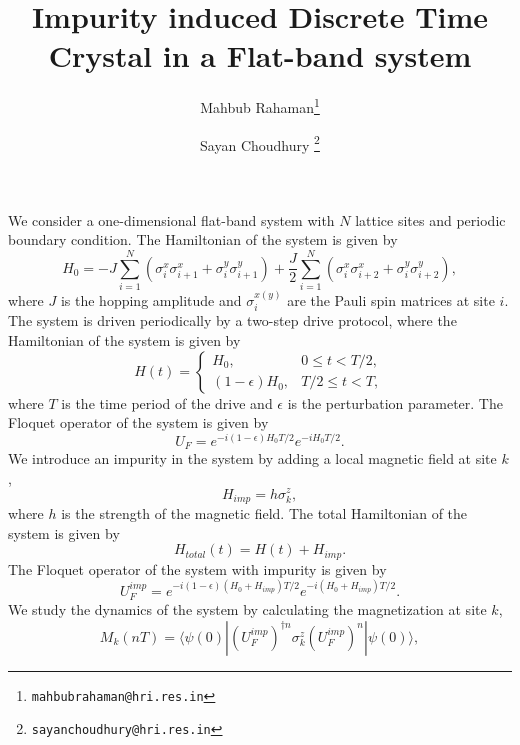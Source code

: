 \documentclass[a4paper, 11pt]{article}
\title{\bf Impurity induced Discrete Time Crystal in a Flat-band system}
\author[1,2]{Mahbub Rahaman\thanks{\texttt{mahbubrahaman@hri.res.in}}}
\author[1]{Sayan Choudhury \thanks{\texttt{sayanchoudhury@hri.res.in}}}
\affil[2]{\small Harish-Chandra Research Institute, A CI of Homi Bhabha National Institute, Prayagraj, Uttar Pradesh–211019, India}
\date{}
\begin{document}
\maketitle
We consider a one-dimensional flat-band system with $N$ lattice sites and periodic boundary condition. The Hamiltonian of the system is given by
\begin{equation}
    H_{0} = -J\sum_{i=1}^{N}(\sigma_{i}^{x}\sigma_{i+1}^{x} + \sigma_{i}^{y}\sigma_{i+1}^{y}) + \frac{J}{2}\sum_{i=1}^{N}(\sigma_{i}^{x}\sigma_{i+2}^{x} + \sigma_{i}^{y}\sigma_{i+2}^{y}),
\end{equation}
where $J$ is the hopping amplitude and $\sigma_{i}^{x(y)}$ are the Pauli spin matrices at site $i$. The system is driven periodically by a two-step drive protocol, where the Hamiltonian of the system is given by
\begin{equation}
    H(t) = \begin{cases}
    H_{0}, & 0 \leq t < T/2, \\
    (1-\epsilon)H_{0}, & T/2 \leq t < T,
    \end{cases}
\end{equation}
where $T$ is the time period of the drive and $\epsilon$ is the perturbation parameter. The Floquet operator of the system is given by
\begin{equation}
    U_{F} = e^{-i(1-\epsilon)H_{0}T/2}e^{-iH_{0}T/2}.
\end{equation}
We introduce an impurity in the system by adding a local magnetic field at site $k$,
\begin{equation}
    H_{imp} = h\sigma_{k}^{z},
\end{equation}
where $h$ is the strength of the magnetic field. The total Hamiltonian of the system is given by
\begin{equation}
    H_{total}(t) = H(t) + H_{imp}.
\end{equation}
The Floquet operator of the system with impurity is given by
\begin{equation}
    U_{F}^{imp} = e^{-i(1-\epsilon)(H_{0}+H_{imp})T/2}e^{-i(H_{0}+H_{imp})T/2}.
\end{equation}
We study the dynamics of the system by calculating the magnetization at site $k$,
\begin{equation}    
    M_{k}(nT) = \langle \psi(0)| (U_{F}^{imp})^{\dagger n} \sigma_{k}^{z} (U_{F}^{imp})^{n} |\psi(0)\rangle,
\end{equation}
\end{document}
